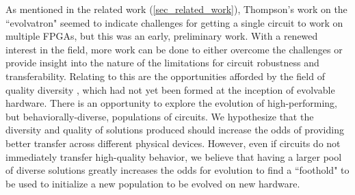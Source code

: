 \documentclass{ieeeaccess}
\begin{document}
As mentioned in the related work (\ref{sec_related_work}), Thompson's work on the ``evolvatron" seemed to indicate challenges for getting a single circuit to work on multiple FPGAs, but this was an early, preliminary work. With a renewed interest in the field, more work can be done to either overcome the challenges or provide insight into the nature of the limitations for circuit robustness and transferability. 
Relating to this are the opportunities afforded by the field of quality diversity \cite{Pugh2016QualityComputation}, which had not yet been formed at the inception of evolvable hardware. There is an opportunity to explore the evolution of high-performing, but behaviorally-diverse, populations of circuits. %
We hypothesize that the diversity and quality of solutions produced should increase the odds of providing better transfer across different physical devices. However, even if circuits do not immediately transfer high-quality behavior, we believe that having a larger pool of diverse solutions greatly increases the odds for evolution to find a ``foothold" to be used to initialize a new population to be evolved on new hardware.
\end{document}
